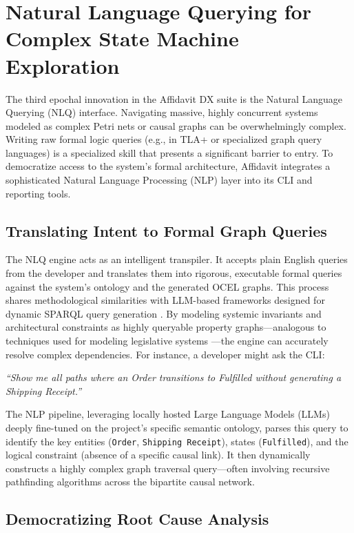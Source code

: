 \section{Natural Language Querying for Complex State Machine Exploration}
\label{sec:qol_natural_language}

The third epochal innovation in the Affidavit DX suite is the Natural Language Querying (NLQ) interface. Navigating massive, highly concurrent systems modeled as complex Petri nets or causal graphs can be overwhelmingly complex. Writing raw formal logic queries (e.g., in TLA+ or specialized graph query languages) is a specialized skill that presents a significant barrier to entry. To democratize access to the system's formal architecture, Affidavit integrates a sophisticated Natural Language Processing (NLP) layer into its CLI and reporting tools.

\subsection{Translating Intent to Formal Graph Queries}

The NLQ engine acts as an intelligent transpiler. It accepts plain English queries from the developer and translates them into rigorous, executable formal queries against the system's ontology and the generated OCEL graphs. This process shares methodological similarities with LLM-based frameworks designed for dynamic SPARQL query generation \cite{ref_FIRESPARQLALLMb41}. By modeling systemic invariants and architectural constraints as highly queryable property graphs---analogous to techniques used for modeling legislative systems \cite{ref_ModellingLegisl44}---the engine can accurately resolve complex dependencies. For instance, a developer might ask the CLI:

\textit{``Show me all paths where an Order transitions to Fulfilled without generating a Shipping Receipt.''}

The NLP pipeline, leveraging locally hosted Large Language Models (LLMs) deeply fine-tuned on the project's specific semantic ontology, parses this query to identify the key entities (\texttt{Order}, \texttt{Shipping Receipt}), states (\texttt{Fulfilled}), and the logical constraint (absence of a specific causal link). It then dynamically constructs a highly complex graph traversal query---often involving recursive pathfinding algorithms across the bipartite causal network. 

\subsection{Democratizing Root Cause Analysis}


